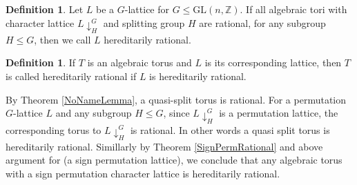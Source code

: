 \documentclass{article}
\theoremstyle{plain}
\theoremstyle{definition}
\newtheorem{definition}[theorem]{Definition}
\newcommand{\Z}{\ensuremath{\mathbb{Z}}}
\begin{document}
\begin{definition}
Let $L$ be a $G$-lattice for $G\leq \mathrm{GL}(n,\Z)$. If all algebraic tori with 
character lattice $L\downarrow_H^G$ and splitting group $H$ are rational, for any 
subgroup $H \leq G$, then we call $L$ hereditarily rational. 
\end{definition} 
\begin{definition}
If $T$ is an algebraic torus and $L$ is its corresponding lattice, then $T$ is called 
hereditarily rational if $L$ is hereditarily rational.
\end{definition}
\noindent
By Theorem \ref{NoNameLemma}, a quasi-split torus is rational. For a permutation 
$G$-lattice $L$ and any subgroup $H\leq G$, since $L\downarrow_H^G$ is a permutation 
lattice, the corresponding torus to $L\downarrow_H^G$ is rational. In other words a 
quasi split torus is hereditarily rational. Simillarly by Theorem \ref{SignPermRational} 
and above argument for (a sign permutation lattice), we conclude that any algebraic 
torus with a sign permutation character lattice is hereditarily rational. \\ \\
\end{document}

